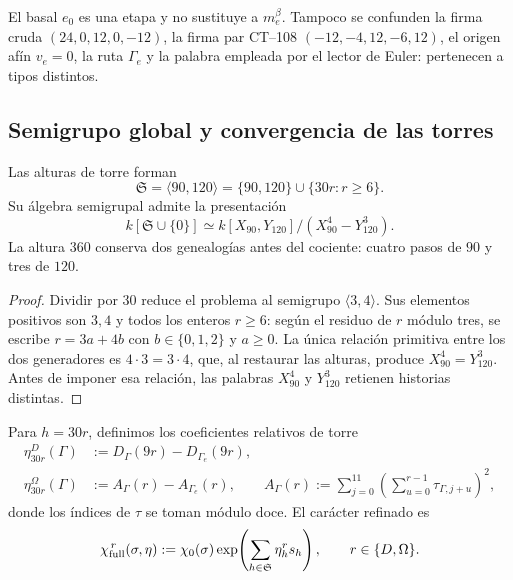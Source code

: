 El basal \(e_0\) es una etapa y no sustituye a \(m_e^\beta\). Tampoco se
confunden la firma cruda \((24,0,12,0,-12)\), la firma par CT--108
\((-12,-4,12,-6,12)\), el origen afín \(v_e=0\), la ruta \(\Gamma_e\) y
la palabra empleada por el lector de Euler: pertenecen a tipos distintos.

\subsection{Semigrupo global y convergencia de las torres}

\begin{theorem}
\label{10j-thm-semigrupo}
Las alturas de torre forman
\begin{equation}
 \mathfrak S=\langle90,120\rangle
 =\{90,120\}\cup\{30r:r\ge6\}.
 \label{10j-eq-semigrupo}
\end{equation}
Su álgebra semigrupal admite la presentación
\begin{equation}
 k[\mathfrak S\cup\{0\}]
 \simeq k[X_{90},Y_{120}]/(X_{90}^4-Y_{120}^3).
 \label{10j-eq-algebra-semigrupo}
\end{equation}
La altura \(360\) conserva dos genealogías antes del cociente: cuatro pasos
de \(90\) y tres de \(120\).
\end{theorem}

\begin{proof}
Dividir por \(30\) reduce el problema al semigrupo \(\langle3,4\rangle\).
Sus elementos positivos son \(3,4\) y todos los enteros \(r\ge6\): según el
residuo de \(r\) módulo tres, se escribe \(r=3a+4b\) con
\(b\in\{0,1,2\}\) y \(a\ge0\). La única relación primitiva entre los dos
generadores es \(4\cdot3=3\cdot4\), que, al restaurar las alturas, produce
\(X_{90}^4=Y_{120}^3\). Antes de imponer esa relación, las palabras
\(X_{90}^4\) y \(Y_{120}^3\) retienen historias distintas.
\end{proof}

Para \(h=30r\), definimos los coeficientes relativos de torre
\begin{align}
 \eta_{30r}^D(\Gamma)
 &:=D_\Gamma(9r)-D_{\Gamma_e}(9r),
 \label{10j-eq-eta-d}\\
 \eta_{30r}^\Omega(\Gamma)
 &:=A_\Gamma(r)-A_{\Gamma_e}(r),
 \qquad
 A_\Gamma(r):=
 \sum_{j=0}^{11}
 \left(\sum_{u=0}^{r-1}\tau_{\Gamma,j+u}\right)^2,
 \label{10j-eq-eta-omega}
\end{align}
donde los índices de \(\tau\) se toman módulo doce. El carácter refinado es
\begin{equation}
 \chi_{\rm full}^{\,r}(\sigma,\eta)
 :=\chi_0(\sigma)
 \exp\!\left(\sum_{h\in\mathfrak S}\eta_h^r s_h\right),
 \qquad r\in\{D,\Omega\}.
 \label{10j-eq-caracter-full}
\end{equation}

